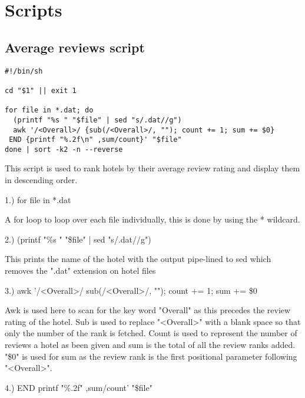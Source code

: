 \documentclass{article}
\begin{document}
\newpage

\section{Scripts}

\subsection{Average reviews script}

\begin{lstlisting}
#!/bin/sh

cd "$1" || exit 1 

for file in *.dat; do
  (printf "%s " "$file" | sed "s/.dat//g")
  awk '/<Overall>/ {sub(/<Overall>/, ""); count += 1; sum += $0}
 END {printf "%.2f\n" ,sum/count}' "$file"
done | sort -k2 -n --reverse

\end{lstlisting}

This script is used to rank hotels by their average review rating
and display them in descending order.
\newline

1.) for file in *.dat
\newline

A for loop to loop over each file individually, this is done by using
the * wildcard.
\newline

2.) (printf "\%s " "\$file" | sed "s/.dat//g")

This prints the name of the hotel with the output pipe-lined to
sed which removes the ".dat" extension on hotel files
\newline

3.) awk '/<Overall>/ {sub(/<Overall>/, ""); count += 1; sum += \$0}

Awk is used here to scan for the key word "Overall" as this precedes
the review rating of the hotel. Sub is used to replace "<Overall>"
with a blank space so that only the number of the rank is fetched.
Count is used to represent the number of reviews a hotel as been
given and sum is the total of all the review ranks added. "\$0" is
used for sum as the review rank is the first positional parameter
following "<Overall>".
\newline








4.) END {printf "\%.2f" ,sum/count}' "\$file"
\end{document}
